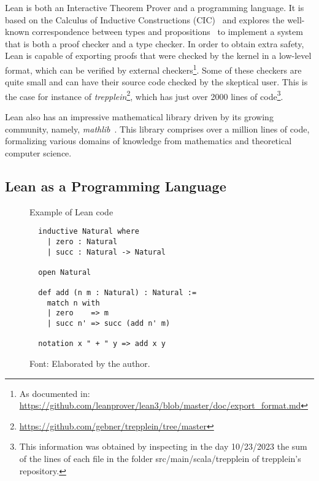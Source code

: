
Lean is both an Interactive Theorem Prover and a programming language.
%
It is based on the Calculus of Inductive Constructions (CIC)~\cite{cic_ref}
and explores the well-known correspondence between types and
propositions~\cite{ch_correspondence} to implement a system that is both a
proof checker and a type checker.
%
In order to obtain extra safety, Lean is capable of exporting proofs that
were checked by the kernel in a low-level format, which can be verified
by external checkers\footnote{As documented in:
\url{https://github.com/leanprover/lean3/blob/master/doc/export_format.md}}.
%
Some of these checkers are quite small and can have their source code
checked by the skeptical user. This is the case for instance of
\textit{trepplein}\footnote{\url{https://github.com/gebner/trepplein/tree/master}},
which has just over 2000 lines of code\footnote{This information was obtained by
inspecting in the day 10/23/2023 the sum of the lines of each file in the folder
src/main/scala/trepplein of trepplein's repository.}.


%
Lean also has an impressive mathematical library driven by its growing
community, namely, \textit{mathlib}~\cite{mathlib}.
%
This library comprises over a million lines of code, formalizing various
domains of knowledge from mathematics and theoretical computer science.

\subsection{Lean as a Programming Language}


\begin{figure}[t]
\caption{Example of Lean code}\label{leanAdd}
\begin{verbatim}
  inductive Natural where
    | zero : Natural
    | succ : Natural -> Natural

  open Natural

  def add (n m : Natural) : Natural :=
    match n with
    | zero    => m
    | succ n' => succ (add n' m)

  notation x " + " y => add x y
\end{verbatim}
\caption*{Font: Elaborated by the author.}
\end{figure}


